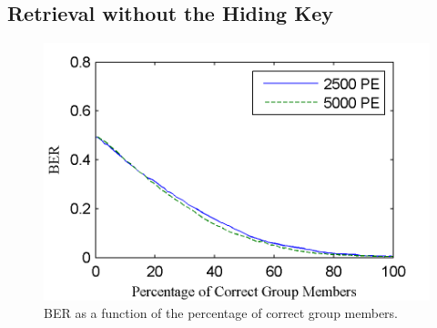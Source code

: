 




\subsection{Retrieval without the Hiding Key}

\begin{figure} 
\begin{center} 
\includegraphics[width=\mywidth]{figs/group_accuaracy.png} 
\caption{BER as a function of the percentage of correct group members.}
\label{fig:group_ac} 
\vspace{-0.1in}

\end{center} 
\end{figure}

